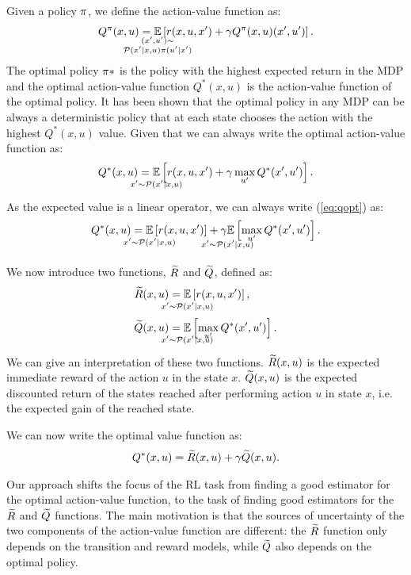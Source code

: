 \documentclass[conference]{IEEEtran}
\begin{document}
Given a policy $\pi$, we define the action-value function as:
\begin{align}
 Q^\pol(x,u)=\underset{\strut\mathclap{\substack{(x', u')\sim \\ \Pmodel(x'|x,u)\pol(u'|x')}}}{\mathbb{E}}\left[ r(x,u,x')+\gamma Q^\pol(x,u)(x',u')\right].
 \label{eq:qpol}
\end{align}
The optimal policy $\pi*$ is the policy with the highest expected return in the MDP and the optimal action-value function $Q^*(x, u)$ is the action-value function of the optimal policy.
It has been shown that the optimal policy in any MDP can be always a deterministic policy that at each state chooses the action with the highest $Q^*(x, u)$ value.
Given that we can always write the optimal action-value function as:
\begin{align}
 Q^*(x,u)=\underset{\strut\mathclap{x'\sim \Pmodel(x'|x,u)}}{\mathbb{E}}\left[ r(x,u,x')+\gamma\max_{u'} Q^*(x',u')\right].
 \label{eq:qopt}
\end{align}
As the expected value is a linear operator, we can always write (\ref{eq:qopt}) as:
\begin{align}
 Q^*(x,u)=\underset{\strut\mathclap{x'\sim \Pmodel(x'|x,u)}}{\mathbb{E}}\left[ r(x,u,x')\right]+\underset{\strut\mathclap{x'\sim \Pmodel(x'|x,u)}}{\gamma\mathbb{E}}\left[ \max_{u'} Q^*(x',u')\right].
 \label{eq:qdec}
\end{align}

We now introduce two functions, $\widetilde{R}$ and $\widetilde{Q}$, defined as:
\begin{align}
 \Rtilde(x,u)&=\underset{\strut\mathclap{x'\sim \Pmodel(x'|x,u)}}{\mathbb{E}}\left[ r(x,u,x')\right], \nonumber\ \\
 \Qtilde(x,u)&=\underset{\strut\mathclap{x'\sim \Pmodel(x'|x,u)}}{\mathbb{E}}\left[\max_{u'} Q^*(x',u')\right].
 \label{eq:rqtilde}
\end{align}
We can give an interpretation of these two functions. $\widetilde{R}(x,u)$ is the expected immediate reward of the action $u$ in the state $x$. $\widetilde{Q}(x,u)$ is the expected discounted return of the states reached after performing action $u$ in state $x$, i.e. the expected gain of the reached state.

We can now write the optimal value function as:
\begin{align}
 Q^*(x,u)=\Rtilde(x,u)+\gamma\Qtilde(x,u).
 \label{eq:qdecrqtilde}
\end{align}

Our approach shifts the focus of the RL task from finding a good estimator for the optimal action-value function, to the task of finding good estimators for the $\widetilde{R}$ and $\widetilde{Q}$ functions. The main motivation is that the sources of uncertainty of the two components of the action-value function are different: the $\widetilde{R}$ function only depends on the transition and reward models, while $\widetilde{Q}$ also depends on the optimal policy.
\end{document}
